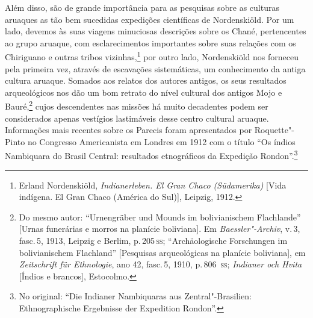Além disso, são de grande importância para as pesquisas sobre as
culturas aruaques as tão bem sucedidas expedições científicas de
Nordenskiöld. Por um lado, devemos às suas viagens minuciosas
descrições sobre os Chané, pertencentes ao grupo aruaque, com
esclarecimentos importantes sobre suas relações com os Chiriguano e
outras tribos vizinhas,\footnote{Erland Nordenskiöld,
  \textit{Indianerleben. El Gran Chaco (Südamerika)} {[}Vida indígena. El
  Gran Chaco (América do Sul){]}, Leipzig, 1912.} por outro
lado, Nordenskiöld nos forneceu pela primeira vez, através de escavações
sistemáticas, um conhecimento da antiga cultura aruaque. Somados aos
relatos dos autores antigos, os seus resultados arqueológicos nos dão um
bom retrato do nível cultural dos antigos Mojo e Bauré,\footnote{Do mesmo autor: ``Urnengräber und Mounds im bolivianischem Flachlande'' {[}Urnas funerárias e morros na planície boliviana{]}. Em \textit{Baessler"-Archiv}, v.\,3, fasc.\,5, 1913, Leipzig e Berlim, p.\,205\,\textsc{ss}; ``Archäologische Forschungen im bolivianischem Flachland'' {[}Pesquisas arqueológicas na planície boliviana{]}, em \textit{Zeitschrift für Ethnologie}, ano 42, fasc.\,5, 1910, p.\,806 \,\textsc{ss}; \textit{Indianer och Hvita} {[}Índios e brancos{]}, Estocolmo.} cujos descendentes nas missões há muito decadentes podem ser considerados apenas vestígios lastimáveis desse centro cultural aruaque. Informações mais recentes sobre os Parecis foram apresentados por Roquette"-Pinto no Congresso Americanista em Londres em 1912 com o título ``Os índios Nambiquara do Brasil Central: resultados etnográficos da Expedição Rondon''.\footnote{No original: ``Die Indianer Nambiquaras aus Zentral"-Brasilien: Ethnographische Ergebnisse der Expedition Rondon''.}

